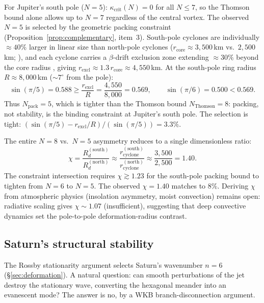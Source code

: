 For Jupiter's south pole ($N = 5$): $\kappa_{\mathrm{crit}}(N) = 0$
for all $N \le 7$, so the Thomson bound alone allows up to $N = 7$
regardless of the central vortex.  The observed $N = 5$ is selected
by the geometric packing constraint
(Proposition~\ref{prop:complementary}, item~3).
South-pole cyclones are individually $\approx 40\%$ larger in
linear size than north-pole cyclones ($r_{\mathrm{core}} \approx
3{,}500$\,km vs.\ $2{,}500$\,km; \citealt{Adriani2018}), and each
cyclone carries a $\beta$-drift exclusion zone extending $\approx
30\%$ beyond the core radius \citep{Gavriel2021}, giving
$r_{\mathrm{excl}} \approx 1.3\,r_{\mathrm{core}} \approx 4{,}550$\,km.
At the south-pole ring radius $R \approx 8{,}000$\,km
($\sim\!7^{\circ}$ from the pole):
\[
  \sin(\pi/5) = 0.588 \ge \frac{r_{\mathrm{excl}}}{R}
  = \frac{4{,}550}{8{,}000} = 0.569,
  \qquad
  \sin(\pi/6) = 0.500 < 0.569.
\]
Thus $N_{\mathrm{pack}} = 5$, which is tighter than the Thomson bound
$N_{\mathrm{Thomson}} = 8$: packing, not stability, is the binding
constraint at Jupiter's south pole.  The selection is tight:
$(\sin(\pi/5) - r_{\mathrm{excl}}/R)/(\sin(\pi/5)) = 3.3\%$.

The entire $N = 8$ vs.\ $N = 5$ asymmetry reduces to a single
dimensionless ratio:
\[
  \chi = \frac{R_d^{(\mathrm{south})}}{R_d^{(\mathrm{north})}}
  \approx \frac{r_{\mathrm{cyclone}}^{(\mathrm{south})}}
              {r_{\mathrm{cyclone}}^{(\mathrm{north})}}
  \approx \frac{3{,}500}{2{,}500} = 1.40.
\]
The constraint intersection requires $\chi \gtrsim 1.23$
for the south-pole packing bound to tighten from $N = 6$ to
$N = 5$.  The observed $\chi = 1.40$ matches to $8\%$.
Deriving $\chi$ from atmospheric physics (insolation asymmetry,
moist convection) remains open: radiative scaling gives
$\chi \sim 1.07$ (insufficient), suggesting that deep convective
dynamics set the pole-to-pole deformation-radius contrast.

\subsection{Saturn's structural stability}
\label{sec:saturn-structural}

The Rossby stationarity argument selects Saturn's wavenumber $n = 6$
(\S\ref{sec:deformation}).
A natural question: can smooth perturbations of the jet destroy the
stationary wave, converting the hexagonal meander into an evanescent
mode?  The answer is no, by a WKB branch-disconnection argument.

